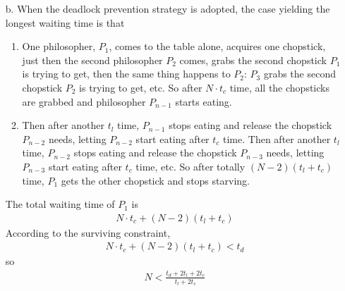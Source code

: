\documentclass[12pt,letterpaper]{article}
\begin{document}
\begin{itemize}
\item[b.] When the deadlock prevention strategy is adopted, the case yielding the longest waiting time is that
\begin{enumerate}
\item One philosopher, $P_1$, comes to the table alone, acquires one chopstick, just then the second philosopher $P_2$ comes, grabs the second chopstick $P_1$ is trying to get, then the same thing happens to $P_2$: $P_3$ grabs the second chopstick $P_2$ is trying to get, etc. So after $N\cdot t_c$ time, all the chopsticks are grabbed and philosopher $P_{n-1}$ starts eating. 
\item Then after another $t_l$ time, $P_{n-1}$ stops eating and release the chopstick $P_{n-2}$ needs, letting $P_{n-2}$ start eating after $t_c$ time. Then after another $t_l$ time, $P_{n-2}$ stops eating and release the chopstick $P_{n-3}$ needs, letting $P_{n-3}$ start eating after $t_c$ time, etc. So after totally $(N-2)(t_l+t_c)$ time, $P_1$ gets the other chopstick and stops starving.
\end{enumerate}
The total waiting time of $P_1$ is
\begin{align}
N\cdot t_c+(N-2)(t_l+t_c)
\end{align}
According to the surviving constraint,
\begin{align}
N\cdot t_c+(N-2)(t_l+t_c)<t_d
\end{align}
so 
\begin{align}
N < \frac{t_d+2t_l+2t_c}{t_l+2t_c}
\end{align}
\end{itemize}
\end{document}
